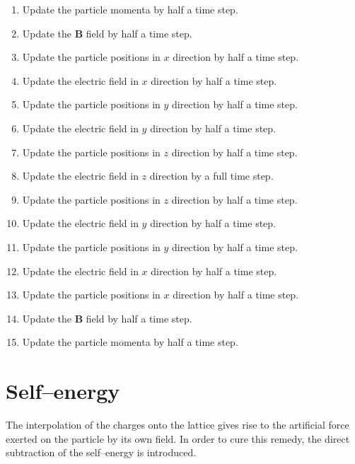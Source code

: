 \documentclass[a4paper, 12pt]{article}
\newcommand{\vect}[1]{\mathbf{#1}}
\begin{document}
\begin{enumerate}
\item Update the particle momenta by half a time step.
\item Update the $\vect B$ field by half a time step.
\item Update the particle positions in $x$ direction by half a time step.
\item Update the electric field in $x$ direction by half a time step.
\item Update the particle positions in $y$ direction by half a time step.
\item Update the electric field in $y$ direction by half a time step.
\item Update the particle positions in $z$ direction by half a time step.
\item Update the electric field in $z$ direction by a full time step.
\item Update the particle positions in $z$ direction by half a time step.
\item Update the electric field in $y$ direction by half a time step.
\item Update the particle positions in $y$ direction by half a time step.
\item Update the electric field in $x$ direction by half a time step.
\item Update the particle positions in $x$ direction by half a time step.
\item Update the $\vect B$ field by half a time step.
\item Update the particle momenta by half a time step.
\end{enumerate}
%
\section{Self--energy}
%
The interpolation of the charges onto the lattice gives rise to the
artificial force exerted on the particle by its own field. In order to
cure this remedy, the direct subtraction of the self--energy is introduced.
\end{document}
